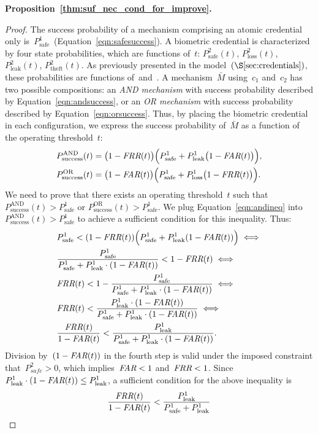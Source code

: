 \documentclass[conference,compsoc]{IEEEtran}
\begin{document}
\medskip
\noindent
\textbf{Proposition~\ref{thm:suf_nec_cond_for_improve}.}
\begin{proof}
    The success probability of a mechanism comprising an atomic credential only is~$P^{1}_{\text{safe}}$~(Equation~\ref{eqn:safesuccess}). A biometric credential is characterized by four state probabilities, which are functions of~$t$: $P^{2}_{\text{safe}}(t)$, $P^{2}_{\text{loss}}(t)$, $P^{2}_{\text{leak}}(t)$, $P^{2}_{\text{theft}}(t)$. As previously presented in the model~$(\S\ref{sec:credentials})$, these probabilities are functions of~\FAR and~\FRR.
    \contprobabilities
    A mechanism~$\bar{M}$ using~$c_1$ and~$c_2$ has two possible compositions: an \emph{AND mechanism} with success probability described by Equation~\ref{eqn:andsuccess}, or an \emph{OR mechanism} with success probability described by Equation~\ref{eqn:orsuccess}. Thus, by placing the biometric credential in each configuration, we express the success probability of~$\bar{M}$ as a function of the operating threshold~$t$:
    \begin{align}
    & P^{\text{AND}}_{\text{success}}(t) = \bigl(1-\textit{FRR}(t)\bigr) \Bigl( P^{1}_{\text{safe}} + P^{1}_{\text{leak}}\bigl(1-\textit{FAR}(t)\bigr) \Bigr)  \label{eqn:andineq}, \\
    & P^{\text{OR}}_{\text{success}}(t) = \bigl(1-\textit{FAR}(t)\bigr) \Bigl( P^{1}_{\text{safe}} + P^{1}_{\text{loss}}\bigl(1-\textit{FRR}(t)\bigr) \Bigr)  \label{eqn:orineq}.
    \end{align}
    We need to prove that there exists an operating threshold~$t$ such that
    $P^{\text{AND}}_{\text{success}}(t) > P^1_{\text{safe}}$ or $P^{\text{OR}}_{\text{success}}(t) > P^1_{\text{safe}}$.
    We plug Equation~\ref{eqn:andineq} into~$P^{\text{AND}}_{\text{success}}(t) > P^1_{\text{safe}}$ to achieve a sufficient condition for this inequality. Thus:
    \begin{align}
    &P^1_{\text{safe}} < (1-\textit{FRR}(t))\Big(P^1_{\text{safe}}+P^1_{\text{leak}}(1-\textit{FAR}(t))\Big) \iff \notag \\
    &\frac{P^{1}_{\text{safe}}}{P^{1}_{\text{safe}}+P^{1}_{\text{leak}}\cdot(1-\textit{FAR}(t))} < 1-\textit{FRR}(t)  \iff \notag \\
    &\textit{FRR}(t) < 1 - \frac{P^{1}_{\text{safe}}}{P^{1}_{\text{safe}}+P^{1}_{\text{leak}}\cdot(1-\textit{FAR}(t))} \iff \notag \\
    &\textit{FRR}(t) < \frac{P^{1}_{\text{leak}}\cdot(1-\textit{FAR}(t))}{P^{1}_{\text{safe}}+P^{1}_{\text{leak}}\cdot(1-\textit{FAR}(t))} \iff \notag \\
    &\frac{\textit{FRR}(t)}{1-\textit{FAR}(t)} < \frac{P^{1}_{\text{leak}}}{P^{1}_{\text{safe}}+P^{1}_{\text{leak}}\cdot(1-\textit{FAR}(t))}. \label{eqn:necessary term_1}
    \end{align}
    Division by~$(1-\textit{FAR}(t))$ in the fourth step is valid under the imposed constraint that~$P^{2}_\textit{safe}>0$, which implies~$\textit{FAR}<1$ and~$\textit{FRR}<1$.
    Since~$P^{1}_{\text{leak}}\cdot(1-\textit{FAR}(t)) \le P^{1}_{\text{leak}}$, a sufficient condition for the above inequality is
    \begin{equation}
        \label{eqn:FRRineq}
    \frac{\textit{FRR}(t)}{1-\textit{FAR}(t)} < \frac{P^{1}_{\text{leak}}}{P^{1}_{\text{safe}}+P^{1}_{\text{leak}}}
    \end{equation}


\end{proof}
\end{document}
